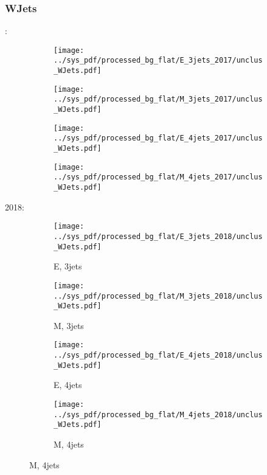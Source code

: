 \documentclass{beamer}
\begin{document}
\begin{frame}
\frametitle{WJets}
\fontsize{5}{1}:
\begin{figure}
\centering
\begin{subfigure}[b]{0.24\textwidth}
\texttt{[image: ../sys\_pdf/processed\_bg\_flat/E\_3jets\_2017/unclus\_WJets.pdf]}
\end{subfigure}
\begin{subfigure}[b]{0.24\textwidth}
\texttt{[image: ../sys\_pdf/processed\_bg\_flat/M\_3jets\_2017/unclus\_WJets.pdf]}
\end{subfigure}
\begin{subfigure}[b]{0.24\textwidth}
\texttt{[image: ../sys\_pdf/processed\_bg\_flat/E\_4jets\_2017/unclus\_WJets.pdf]}
\end{subfigure}
\begin{subfigure}[b]{0.24\textwidth}
\texttt{[image: ../sys\_pdf/processed\_bg\_flat/M\_4jets\_2017/unclus\_WJets.pdf]}
\end{subfigure}
\end{figure}
2018:
\begin{figure}
\centering
\begin{subfigure}[b]{0.24\textwidth}
\texttt{[image: ../sys\_pdf/processed\_bg\_flat/E\_3jets\_2018/unclus\_WJets.pdf]}
\captionsetup{font=tiny}
\caption{E, 3jets}
\end{subfigure}
\begin{subfigure}[b]{0.24\textwidth}
\texttt{[image: ../sys\_pdf/processed\_bg\_flat/M\_3jets\_2018/unclus\_WJets.pdf]}
\captionsetup{font=tiny}
\caption{M, 3jets}
\end{subfigure}
\begin{subfigure}[b]{0.24\textwidth}
\texttt{[image: ../sys\_pdf/processed\_bg\_flat/E\_4jets\_2018/unclus\_WJets.pdf]}
\captionsetup{font=tiny}
\caption{E, 4jets}
\end{subfigure}
\begin{subfigure}[b]{0.24\textwidth}
\texttt{[image: ../sys\_pdf/processed\_bg\_flat/M\_4jets\_2018/unclus\_WJets.pdf]}
\captionsetup{font=tiny}
\caption{M, 4jets}
\end{subfigure}
\end{figure}
\end{frame}
\end{document}
